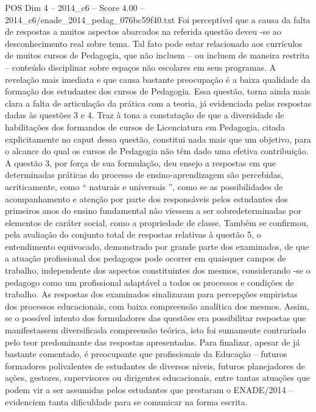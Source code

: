 \begin{textsample}{POS Dim 4 – 2014\_c6 – Score 4.00 – 2014\_c6/enade\_2014\_pedag\_076bc59f40.txt}
Foi perceptível que a causa da falta de respostas a muitos aspectos abarcados na referida questão deveu -se ao desconhecimento real sobre tema.
Tal fato pode estar relacionado aos currículos de muitos cursos de Pedagogia, que não incluem – ou incluem de maneira restrita – conteúdo disciplinar sobre espaços não escolares em seus programas.
A revelação mais imediata e que causa bastante preocupação é a baixa qualidade da formação dos estudantes dos cursos de Pedagogia.
Essa questão, torna ainda mais clara a falta de articulação da prática com a teoria, já evidenciada pelas respostas dadas às questões 3 e 4.
Traz à tona a constatação de que a diversidade de habilitações dos formandos de cursos de Licenciatura em Pedagogia, citada explicitamente no caput dessa questão, constitui nada mais que um objetivo, para o alcance do qual os cursos de Pedagogia não têm dado uma efetiva contribuição.
A questão 3, por força de sua formulação, deu ensejo a respostas em que determinadas práticas do processo de ensino-aprendizagem são percebidas, acriticamente, como “ naturais e universais ”, como se as possibilidades de acompanhamento e atenção por parte dos responsáveis pelos estudantes dos primeiros anos do ensino fundamental não viessem a ser sobredeterminadas por elementos de caráter social, como a propriedade de classe.
Também se confirmou, pela avaliação do conjunto total de respostas relativas à questão 5, o entendimento equivocado, demonstrado por grande parte dos examinados, de que a atuação profissional dos pedagogos pode ocorrer em quaisquer campos de trabalho, independente dos aspectos constituintes dos mesmos, considerando -se o pedagogo como um profissional adaptável a todos os processos e condições de trabalho.
As respostas dos examinados sinalizaram para percepções empiristas dos processos educacionais, com baixa compreensão analítica dos mesmos.
Assim, se o possível intento dos formuladores das questões era possibilitar respostas que manifestassem diversificada compreensão teórica, isto foi sumamente contrariado pelo teor predominante das respostas apresentadas.
Para finalizar, apesar de já bastante comentado, é preocupante que profissionais da Educação – futuros formadores polivalentes de estudantes de diversos níveis, futuros planejadores de ações, gestores, supervisores ou dirigentes educacionais, entre tantas atuações que podem vir a ser assumidas pelos estudantes que prestaram o ENADE/2014 – evidenciem tanta dificuldade para se comunicar na forma escrita.

\end{textsample}
